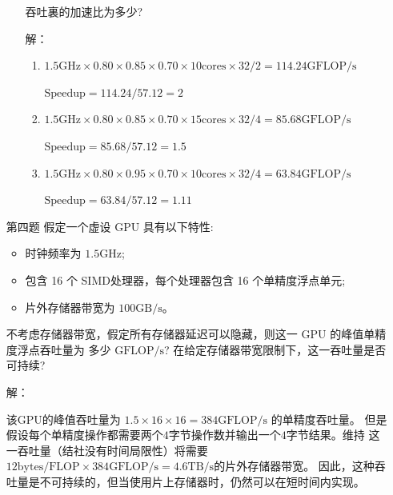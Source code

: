 \documentclass{ctexart}
\begin{document}
\begin{enumerate}
\begin{enumerate}
                    \par 吞吐裏的加速比为多少?
                    \par 解：
                    \begin{enumerate}
                        \item $1.5\mathrm{GHz}\times 0.80\times 0.85\times 0.70\times 10\mathrm{cores}\times32/2=114.24\mathrm{GFLOP/s}$
                              \par $\mathrm{Speedup}=114.24/57.12=2$
                        \item $1.5\mathrm{GHz}\times 0.80\times 0.85\times 0.70\times 15\mathrm{cores}\times32/4=85.68\mathrm{GFLOP/s}$
                              \par $\mathrm{Speedup}=85.68/57.12=1.5$
                        \item $1.5\mathrm{GHz}\times 0.80\times 0.95\times 0.70\times 10\mathrm{cores}\times32/4= 63.84\mathrm{GFLOP/s}$
                              \par $\mathrm{Speedup}=63.84/57.12=1.11$
                    \end{enumerate}
          \end{enumerate}

    \item[第四题]  假定一个虚设 $\mathrm{GPU}$ 具有以下特性:
          \begin{itemize}
              \item 时钟频率为 $1.5 \mathrm{GHz}$;
              \item 包含 16 个 SIMD处理器，每个处理器包含 16 个单精度浮点单元;
              \item 片外存储器带宽为 $100 \mathrm{GB/s}$。
          \end{itemize}
          不考虑存储器带宽，假定所有存储器延迟可以隐藏，则这一 $\mathrm{GPU}$
          的峰值单精度浮点吞吐量为 多少 $\mathrm{GFLOP/s}$?
          在给定存储器带宽限制下，这一吞吐量是否可持续?
          \par 解：
          \par 该$\mathrm{GPU}$的峰值吞吐量为 $1.5 \times 16 \times 16=384\mathrm{GFLOP/s}$
          的单精度吞吐量。
          但是假设每个单精度操作都需要两个$4$字节操作数并输出一个$4$字节结果。维持
          这一吞吐量（结社没有时间局限性）将需要$12 \mathrm{bytes/FLOP} \times 384 \mathrm{GFLOP/s}=4.6\mathrm{TB/s}$的片外存储器带宽。
          因此，这种吞吐量是不可持续的，但当使用片上存储器时，仍然可以在短时间内实现。
\end{enumerate}
\end{document}
